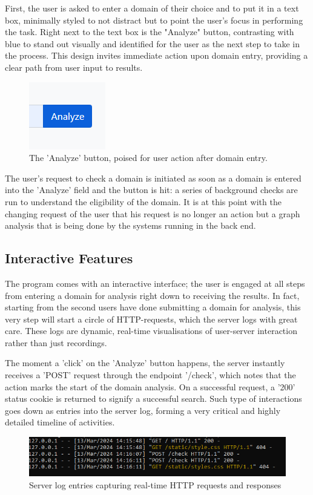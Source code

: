 First, the user is asked to enter a domain of their choice and to put it in a text box, minimally styled to not distract but to point the user's focus in performing the task. Right next to the text box is the "Analyze" button, contrasting with blue to stand out visually and identified for the user as the next step to take in the process. This design invites immediate action upon domain entry, providing a clear path from user input to results.

\begin{figure}[H]
    \centering
    \includegraphics[width=0.3\linewidth]{project/8.png}
    \caption{The 'Analyze' button, poised for user action after domain entry.}
    \label{fig:imple2222}
\end{figure}

The user's request to check a domain is initiated as soon as a domain is entered into the 'Analyze' field and the button is hit: a series of background checks are run to understand the eligibility of the domain. It is at this point with the changing request of the user that his request is no longer an action but a graph analysis that is being done by the systems running in the back end.

\subsection{Interactive Features}

The program comes with an interactive interface; the user is engaged at all steps from entering a domain for analysis right down to receiving the results. In fact, starting from the second users have done submitting a domain for analysis, this very step will start a circle of HTTP-requests, which the server logs with great care. These logs are dynamic, real-time visualisations of user-server interaction rather than just recordings.


The moment a 'click' on the 'Analyze' button happens, the server instantly receives a 'POST' request through the endpoint '/check', which notes that the action marks the start of the domain analysis. On a successful request, a '200' status cookie is returned to signify a successful search. Such type of interactions goes down as entries into the server log, forming a very critical and highly detailed timeline of activities.
\begin{figure}[H]
    \centering
    \includegraphics[width=0.8\linewidth]{project/I.png}
    \caption{Server log entries capturing real-time HTTP requests and responses}
    \label{fig:imple22222}
\end{figure}

